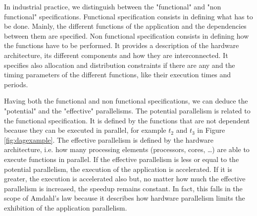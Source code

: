 
In industrial practice, we distinguish between the "functional" and "non functional" specifications. Functional specification consists in defining what has to be done. Mainly, the different functions of the application and the dependencies between them are specified. Non functional specification consists in defining how the functions have to be performed. It provides a description of the hardware architecture, its different components and how they are interconnected. It specifies also allocation and distribution constraints if there are any and the timing parameters of the different functions, like their execution times and periods.

Having both the functional and non functional specifications, we can deduce the "potential" and the "effective" parallelisms. The potential parallelism is related to the functional specification. It is defined by the functions that are not dependent because they can be executed in parallel, for example $t_2$ and $t_3$ in Figure \ref{fig:dagexample}. The effective parallelism is defined by the hardware architecture, i.e. how many processing elements (processors, cores, \ldots) are able to execute functions in parallel. If the effective parallelism is less or equal to the potential parallelism, the execution of the application is accelerated. If it is greater, the execution is accelerated also but, no matter how much the effective parallelism is increased, the speedup remains constant. In fact, this falls in the scope of Amdahl's law because it describes how hardware parallelism limits the exhibition of the application parallelism.



